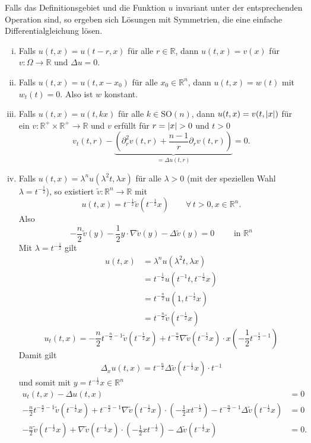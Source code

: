 
Falls das Definitionsgebiet und die Funktion $u$ invariant unter der entsprechenden Operation sind, so ergeben sich Lösungen mit Symmetrien, die eine einfache
Differentialgleichung lösen.

\begin{enumerate}[(i)]
	\item Falls $u(t,x)=u(t-r,x)$ für alle $r \in \mathbb{R}$, dann $u(t,x)=v(x)$ für $v : \Omega \to \mathbb{R}$ und $ \Delta u = 0$.
	\item Falls $u(t,x)= u(t,x-x_0)$ für alle $x_0 \in \mathbb{R}^n$, dann $u(t,x)= w(t)$ mit $w_t(t)=0$. Also ist $w$ konstant.
	\item Falls $u(t,x)=u(t,kx)$ für alle $k \in \text{SO}(n)$, 
	dann $u(t,x)=v(t,\lvert x\rvert)$ für ein $v : \mathbb{R}^+ \times \mathbb{R}^+ \to \mathbb{R}$ und $v$ erfüllt für $r= \lvert x\rvert >0$ und $t >0$
	\[
		v_t(t,r) - \underset{=\Delta u(t,r)}{\underbrace{\left( \partial^2_r v(t,r)+ \frac{n-1}{r} \partial_r v(t,r) \right)}}=0.
	\]

	\item Falls $u(t,x)= \lambda^n u(\lambda^2 t, \lambda x)$ für alle $\lambda > 0$ (mit der speziellen Wahl $\lambda = t^{- \frac{1}{2}}$), so existiert $\tilde v : \mathbb{R}^n \to \mathbb{R}$ mit
	\[
		u(t,x) = t^{- \frac{1}{2}} \tilde v ( t^{- \frac{1}{2}}x) \qquad \forall\, t>0, x \in \mathbb{R}^n.
	\]
	Also
	\[
		- \frac{n}{2} \tilde v(y) - \frac{1}{2} y \cdot  \nabla \tilde v(y)- \Delta \tilde v(y) = 0 \qquad \text{ in } \mathbb{R}^n
	\]
	Mit $\lambda = t^{- \frac{1}{2}}$ gilt
	\begin{align*}
		u(t,x) &= \lambda^n u(\lambda^2 t, \lambda x) \\
		&= t^{- \frac{1}{2}} u(t^{-1}t, t^{- \frac{1}{2}} x) \\
		&= t^{- \frac{n}{2}} u(1, t^{- \frac{1}{2}} x) \\
		&= t^{- \frac{n}{2}} \tilde v(t^{- \frac{1}{2}} x)
	\end{align*}
	\[
		u_t(t,x) = - \frac{n}{2} t^{- \frac{n}{2} - 1} \tilde v(t^{- \frac{1}{2}} x) + t^{- \frac{n}{2}}  \nabla \tilde v(t^{- \frac{1}{2}} x) \cdot x 
		\left( - \frac{1}{2} t^{- \frac{1}{2}-1} \right)
	\]
	Damit gilt
	\[
		\Delta_x u(t,x) = t^{- \frac{n}{2}} \Delta \tilde v(t^{- \frac{1}{2}} x) \cdot t^{-1}
	\]
	und somit mit $y = t^{- \frac{1}{2}} x \in \mathbb{R}^n$
	\begin{align*}
		u_t(t,x) - \Delta u(t,x) &= 0 \\
		-\frac{n}{2} t^{- \frac{n}{2}-1} \tilde v(t^{- \frac{1}{2}} x) + t^{- \frac{n}{2}-1}  
		\nabla  \tilde v(t^{- \frac{1}{2}} x) \cdot (-\frac{1}{2} x t^{- \frac{1}{2}}) - t^{- \frac{n}{2}-1}  \Delta \tilde v(t^{- \frac{1}{2}}x) &= 0 \\
		-\frac{n}{2} \tilde v(t^{- \frac{1}{2}}x)+  \nabla \tilde v(t^{- \frac{1}{2}} x) \cdot \left( - \frac{1}{2} x t^{- \frac{1}{2}} \right)- \Delta \tilde v(t^{- \frac{1}{2}}x) &=0 .
	\end{align*}
	

\end{enumerate}
